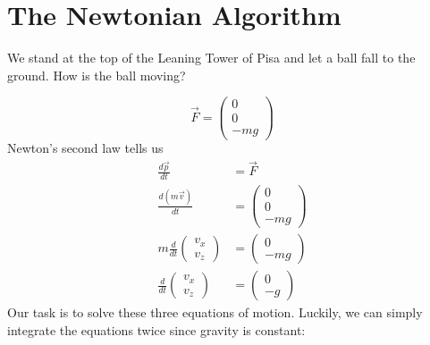 \section{The Newtonian Algorithm}
\begin{mybox}
We stand at the top of the Leaning Tower of Pisa and let a ball fall to the ground. How is the ball moving?
\end{mybox}
$$
\vec{F}=\left(\begin{array}{r}
{0} \\
{0} \\
{-m g}
\end{array}\right)
$$
Newton's second law tells us
$$
\begin{aligned}
\frac{d \vec{p}}{d t} &=\vec{F} \\
\frac{d(m \vec{v})}{d t} &=\left(\begin{array}{r}
{0} \\
{0} \\
{-m g}
\end{array}\right) \\
m \frac{d}{d t}\left(\begin{array}{l}
{v_{x}} \\
{v_{z}}
\end{array}\right) &=\left(\begin{array}{r}
{0} \\
{-m g}
\end{array}\right) \\
\frac{d}{d t}\left(\begin{array}{l}
{v_{x}} \\
{v_{z}}
\end{array}\right) &=\left(\begin{array}{r}
{0} \\
{-g}
\end{array}\right)
\end{aligned}
$$
Our task is to solve these three equations of motion. Luckily, we can simply integrate the equations twice since gravity is constant:
